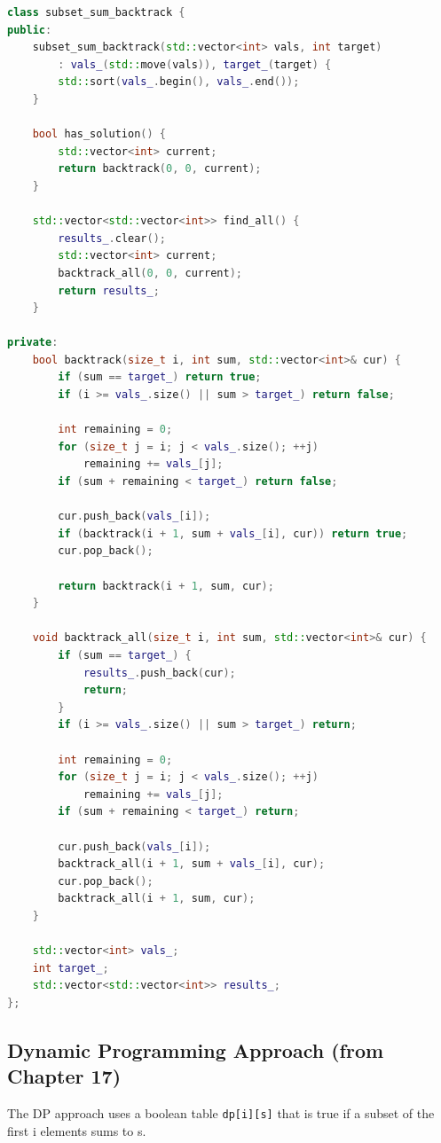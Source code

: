 \begin{lstlisting}[language=C++]
class subset_sum_backtrack {
public:
    subset_sum_backtrack(std::vector<int> vals, int target)
        : vals_(std::move(vals)), target_(target) {
        std::sort(vals_.begin(), vals_.end());
    }

    bool has_solution() {
        std::vector<int> current;
        return backtrack(0, 0, current);
    }

    std::vector<std::vector<int>> find_all() {
        results_.clear();
        std::vector<int> current;
        backtrack_all(0, 0, current);
        return results_;
    }

private:
    bool backtrack(size_t i, int sum, std::vector<int>& cur) {
        if (sum == target_) return true;
        if (i >= vals_.size() || sum > target_) return false;

        int remaining = 0;
        for (size_t j = i; j < vals_.size(); ++j)
            remaining += vals_[j];
        if (sum + remaining < target_) return false;

        cur.push_back(vals_[i]);
        if (backtrack(i + 1, sum + vals_[i], cur)) return true;
        cur.pop_back();

        return backtrack(i + 1, sum, cur);
    }

    void backtrack_all(size_t i, int sum, std::vector<int>& cur) {
        if (sum == target_) {
            results_.push_back(cur);
            return;
        }
        if (i >= vals_.size() || sum > target_) return;

        int remaining = 0;
        for (size_t j = i; j < vals_.size(); ++j)
            remaining += vals_[j];
        if (sum + remaining < target_) return;

        cur.push_back(vals_[i]);
        backtrack_all(i + 1, sum + vals_[i], cur);
        cur.pop_back();
        backtrack_all(i + 1, sum, cur);
    }

    std::vector<int> vals_;
    int target_;
    std::vector<std::vector<int>> results_;
};
\end{lstlisting}

\subsection{Dynamic Programming Approach (from Chapter 17)}

The DP approach uses a boolean table \texttt{dp[i][s]} that is true if a subset of the first i elements sums to s.

